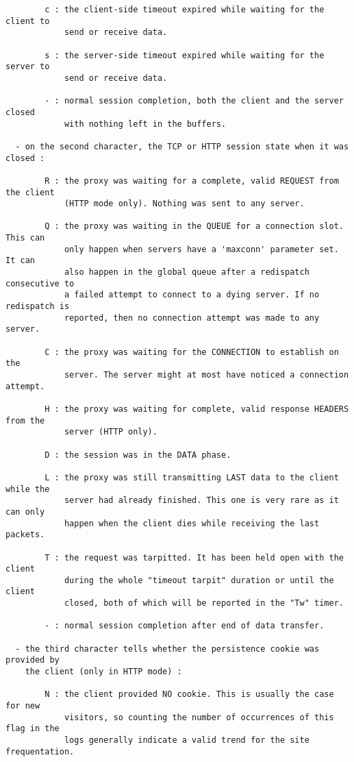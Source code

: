 \begin{verbatim}
        c : the client-side timeout expired while waiting for the client to
            send or receive data.

        s : the server-side timeout expired while waiting for the server to
            send or receive data.

        - : normal session completion, both the client and the server closed
            with nothing left in the buffers.

  - on the second character, the TCP or HTTP session state when it was closed :

        R : the proxy was waiting for a complete, valid REQUEST from the client
            (HTTP mode only). Nothing was sent to any server.

        Q : the proxy was waiting in the QUEUE for a connection slot. This can
            only happen when servers have a 'maxconn' parameter set. It can
            also happen in the global queue after a redispatch consecutive to
            a failed attempt to connect to a dying server. If no redispatch is
            reported, then no connection attempt was made to any server.

        C : the proxy was waiting for the CONNECTION to establish on the
            server. The server might at most have noticed a connection attempt.

        H : the proxy was waiting for complete, valid response HEADERS from the
            server (HTTP only).

        D : the session was in the DATA phase.

        L : the proxy was still transmitting LAST data to the client while the
            server had already finished. This one is very rare as it can only
            happen when the client dies while receiving the last packets.

        T : the request was tarpitted. It has been held open with the client
            during the whole "timeout tarpit" duration or until the client
            closed, both of which will be reported in the "Tw" timer.

        - : normal session completion after end of data transfer.

  - the third character tells whether the persistence cookie was provided by
    the client (only in HTTP mode) :

        N : the client provided NO cookie. This is usually the case for new
            visitors, so counting the number of occurrences of this flag in the
            logs generally indicate a valid trend for the site frequentation.


\end{verbatim}

